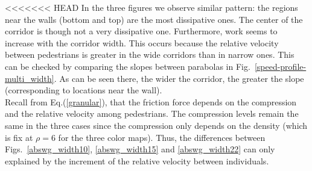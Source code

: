 <<<<<<< HEAD
In the three figures we observe similar pattern: the regions near the walls (bottom and top) are the most dissipative ones. The center of the corridor is though not a very dissipative one. Furthermore, work seems to increase with the corridor width. This occurs because the relative velocity between pedestrians is greater in the wide corridors than in narrow ones. This can be checked by comparing the slopes between parabolas in Fig.~\ref{speed-profile-multi_width}. As can be seen there, the wider the corridor, the greater the slope (corresponding to locations near the wall).\\

Recall from Eq.(\ref{granular}), that the friction force depends on the compression and the relative velocity among pedestrians. The compression levels remain the same in the three cases since the compression only depends on the density (which is fix at $\rho=6$ for the three color maps). Thus, the differences between Figs.~\ref{abswg_width10}, \ref{abswg_width15} and \ref{abswg_width22} can only explained by the increment of the relative velocity between individuals. \\

